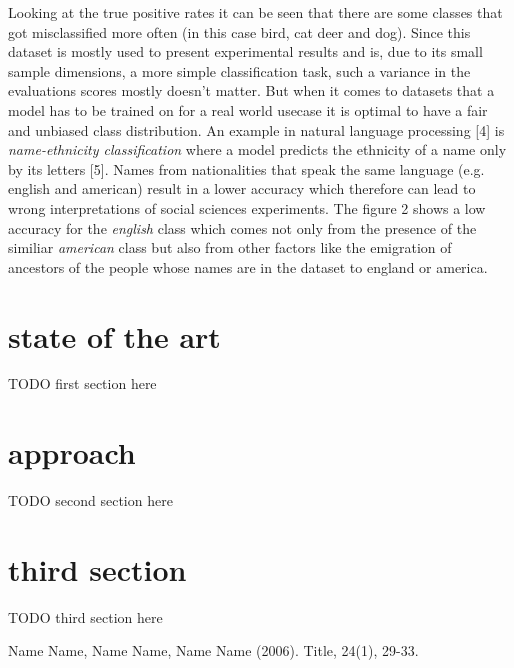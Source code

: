 \documentclass[journal]{IEEEtran}
\begin{document}
Looking at the true positive rates it can be seen that there are some classes that got misclassified more often (in this case bird, cat deer and dog). 
Since this dataset is mostly used to present experimental results and is, due to its small sample dimensions, a more simple classification task, 
such a variance in the evaluations scores mostly doesn't matter. But when it comes to datasets that a model has to be trained on for a real world usecase 
it is optimal to have a fair and unbiased class distribution. An example in natural language processing [4] is \emph{name-ethnicity classification} 
where a model predicts the ethnicity of a name only by its letters [5]. Names from nationalities that speak the same language (e.g. english and american) result in a lower accuracy
which therefore can lead to wrong interpretations of social sciences experiments. The figure 2 shows a low accuracy for the \emph{english} class which comes
not only from the presence of the similiar \emph{american} class but also from other factors like the emigration of ancestors of the people whose names are in the dataset to england or america.

\section{state of the art}
TODO first section here


\section{approach}
TODO second section here


\section{third section}
TODO third section here


\begin{thebibliography}{1}

\bibitem{}
Name Name, Name Name, Name Name (2006). Title, 24(1), 29-33.

\end{thebibliography}
\end{document}
